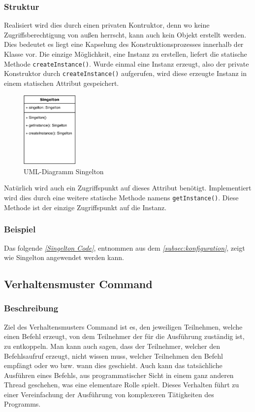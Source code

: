\subsubsection{Struktur}
Realisiert wird dies durch einen privaten Kontruktor, denn wo keine Zugriffsberechtigung von außen herrscht, kann auch kein Objekt erstellt werden.
Dies bedeutet es liegt eine Kapselung des Konstruktionsprozesses innerhalb der Klasse vor.
Die einzige Möglichkeit, eine Instanz zu erstellen, liefert die statische Methode \lstinline{createInstance()}.
Wurde einmal eine Instanz erzeugt, also der private Konstruktor durch \lstinline{createInstance()} aufgerufen, wird diese erzeugte Instanz in einem statischen Attribut gespeichert.\\
\begin{figure}[H]
    \centering
    \includegraphics[width=0.25\textwidth]{fig/ainf/Singelton.pdf}
    \caption{UML-Diagramm Singelton}
\end{figure}
Natürlich wird auch ein Zugriffspunkt auf dieses Attribut benötigt.
Implementiert wird dies durch eine weitere statische Methode namens \lstinline{getInstance()}.
Diese Methode ist der einzige Zugriffspunkt auf die Instanz.
\subsubsection{Beispiel}
Das folgende \textit{\autoref{Singelton Code}}, entnommen aus dem \textit{\autoref{subsec:konfiguration}}, zeigt wie Singelton angewendet werden kann.



\subsection{Verhaltensmuster Command}\label{subsec:verhaltensmuster-command}
\subsubsection{Beschreibung}
Ziel des Verhaltensmusters Command ist es, den jeweiligen Teilnehmen, welche einen Befehl erzeugt, von dem Teilnehmer der für die Ausführung zuständig ist, zu entkoppeln.
Man kann auch sagen, dass der Teilnehmer, welcher den Befehlsaufruf erzeugt, nicht wissen muss, welcher Teilnehmen den Befehl empfängt oder wo bzw. wann dies geschieht.
Auch kann das tatsächliche Ausführen eines Befehls, aus programmatischer Sicht in einem ganz anderen Thread geschehen, was eine elementare Rolle spielt.
Dieses Verhalten führt zu einer Vereinfachung der Ausführung von komplexeren Tätigkeiten des Programms.
